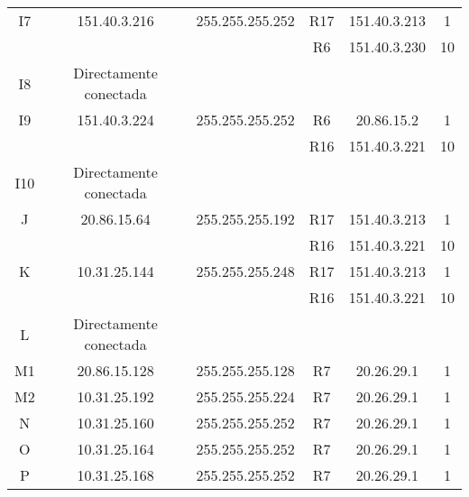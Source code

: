 \begin{tabular}{|c|c|c|c|c|c|}
 	I7 & 151.40.3.216 & 255.255.255.252 & R17 & 151.40.3.213 & 1 \\
       &              &                 & R6 & 151.40.3.230 & 10\\	
 	I8 & Directamente conectada &&&& \\
 	I9 & 151.40.3.224 & 255.255.255.252 & R6 & 20.86.15.2 & 1 \\
       &              &                 & R16 & 151.40.3.221 & 10\\	
 	I10 & Directamente conectada &&&& \\
	\hline
	J & 20.86.15.64 & 255.255.255.192 & R17 & 151.40.3.213 & 1\\
	       &              &                 & R16 & 151.40.3.221 & 10\\	
 	\hline
	K & 10.31.25.144 & 255.255.255.248 & R17 & 151.40.3.213 & 1\\
	       &              &                 & R16 & 151.40.3.221 & 10\\	
 	\hline
	L & Directamente conectada &&&&\\
	\hline
	M1 & 20.86.15.128 & 255.255.255.128 & R7 & 20.26.29.1 & 1\\
	\hline
	M2 & 10.31.25.192 & 255.255.255.224 & R7 & 20.26.29.1 & 1\\
	\hline
	N & 10.31.25.160 & 255.255.255.252 & R7 & 20.26.29.1 & 1\\
	\hline
	O & 10.31.25.164 & 255.255.255.252 & R7 & 20.26.29.1 & 1\\
	\hline
	P & 10.31.25.168 & 255.255.255.252 & R7 & 20.26.29.1 & 1\\
	\hline
\end{tabular}

